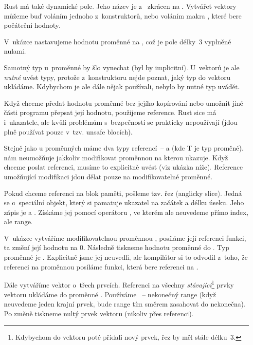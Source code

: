 \documentclass[main.tex]{subfiles}
\begin{document}
Rust má také dynamické pole. Jeho název je z~ zkrácen na .
Vytvářet vektory můžeme buď voláním jednoho z~konstruktorů, nebo voláním makra
, které bere počáteční hodnoty.

\obrazek
{}

V~ukázce nastavujeme hodnotu proměnné  na \irust{[0; 3]}, což je pole délky~3
vyplněné nulami.

Samotný typ u~proměnné  by šlo vynechat (byl by implicitní). U~vektorů je ale
\emph{nutné} uvést typy, protože z~konstruktoru nejde poznat, jaký typ do vektoru
ukládáme. Kdybychom je ale dále nějak používali, nebylo by nutné typ uvádět.


Když chceme předat hodnotu proměnné bez jejího kopírování nebo umožnit jiné části programu
přepsat její hodnotu, použijeme reference. Rust sice má i~ukazatele, ale kvůli problémům
s~bezpečností se prakticky nepoužívají (jdou plně používat pouze v~tzv. unsafe blocích).

Stejně jako u proměnných máme dva typy referencí~--  a  (kde T je
typ proměné).  nám neumožňuje jakkoliv modifikovat proměnnou na kterou ukazuje.
Když chceme poslat referenci, musíme to explicitně uvést (viz ukázka níže). Reference
umožňující modifikaci jdou dělat pouze na modifikovatelné proměnné.

Pokud chceme referenci na blok paměti, pošleme tzv. řez (anglicky slice). Jedná se
o~speciální objekt, který si pamatuje ukazatel na začátek a délku úseku. Jeho zápis je
\irust{&[T]} a . Získáme jej pomocí operátoru \irust{[]}, ve kterém ale
neuvedeme přímo index, ale range.

\obrazek
{}

V~ukázce vytváříme modifikovatelnou proměnnou , posíláme její referenci
funkci, ta změní její hodnotu na 0. Následně tiskneme hodnotu proměnné do .
Typ proměnné je . Explicitně jsme jej neuvedli, ale kompilátor si to odvodil
z~toho, že referenci na proměnnou posíláme funkci, která bere referenci na .

Dále vytváříme vektor o~třech prvcích. Referenci na všechny \emph{stávající}\footnote{
    Kdybychom do vektoru poté přidali nový prvek, řez by měl stále délku~3.
} prvky vektoru ukládáme do proměnné . Používáme ~--
nekonečný range (když neuvedeme jeden krajní prvek, bude range tím směrem zasahovat do
nekonečna). Po změně tiskneme nultý prvek vektoru (nikoliv přes referenci).
\end{document}
